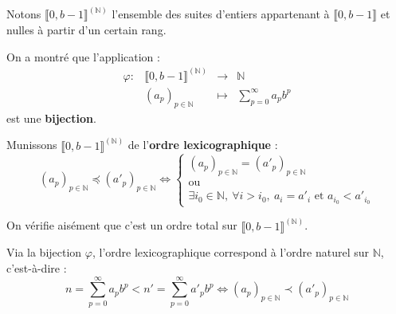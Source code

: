 \documentclass[a4paper,11pt]{article}
\newcommand{\N}{\mathbb{N}}
\newcommand{\mot}[1]{\textcolor{bordeaux}{\textbf{#1}}}
\begin{document}
Notons $\llbracket 0, b-1 \rrbracket^{(\N)}$ l'ensemble des suites d'entiers appartenant à $\llbracket 0, b-1 \rrbracket$ et nulles à partir d'un certain rang.

\begin{proposition}
On a montré que l'application :
$$
\begin{array}{rccl}
\varphi : & \llbracket 0, b-1 \rrbracket^{(\N)} & \longrightarrow & \N \\
& (a_p)_{p\in \N} & \longmapsto & \displaystyle \sum_{p=0}^\infty a_p b^p
\end{array}
$$
est une \mot{bijection}.
\end{proposition}

\begin{definition}
Munissons $\llbracket 0, b-1 \rrbracket^{(\N)}$ de l'\mot{ordre lexicographique} :
$$ (a_p)_{p\in \N} \preceq (a'_p)_{p\in \N} \iff
\begin{cases}
(a_p)_{p\in\N} = (a'_p)_{p\in\N} \\
\text{ou} \\
\exists i_0 \in \N, \ \forall i > i_0, \ a_i = a'_i \text{ et } a_{i_0} < a'_{i_0}
\end{cases}
$$
\end{definition}

On vérifie aisément que c'est un ordre total sur $\llbracket 0, b-1 \rrbracket^{(\N)}$.

\begin{theoreme}
Via la bijection $\varphi$, l'ordre lexicographique correspond à l'ordre naturel sur $\N$, c'est-à-dire :
$$ n = \sum_{p=0}^\infty a_p b^p < n' = \sum_{p=0}^\infty a'_p b^p \iff (a_p)_{p\in \N} \prec (a'_p)_{p\in \N} $$
\end{theoreme}
\end{document}
